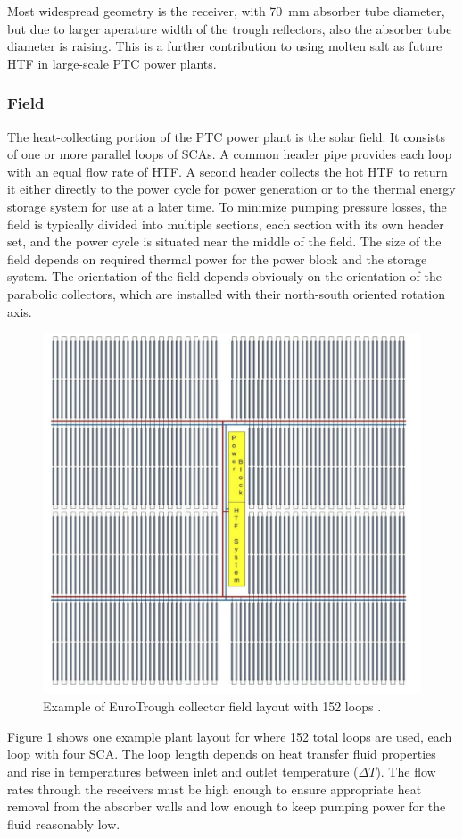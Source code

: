 Most widespread geometry is the receiver, with 70~mm absorber tube diameter, but due to larger aperature width of the trough reflectors, also the absorber tube diameter is raising. This is a further contribution to using molten salt as future HTF in large-scale PTC power plants. 
\pagebreak
\subsubsection{Field}
The heat-collecting portion of the PTC power plant is the solar field. It consists of one or more parallel loops of SCAs. A common header pipe provides each loop with an equal flow rate of HTF. A second header collects the hot HTF to return it either directly to the power cycle for power generation or to the thermal energy storage system for use at a later time. To minimize pumping pressure losses, the field is typically divided into multiple sections, each section with its own header set, and the power cycle is situated near the middle of the field. The size of the field depends on required thermal power for the power block and the storage system. The orientation of the field depends obviously on the orientation of the parabolic collectors, which are installed with their north-south oriented rotation axis.
\begin{figure}[!h] 
\centering
\includegraphics[width=0.7\linewidth]{FIG/PTC_field_EuroTrough}
\caption[Example of a EuroTrough collector field layout with 152 loops.]{Example of EuroTrough collector field layout with 152 loops \cite{VonReeken2014}.}\label{PTC_field_EuroTrough}
\end{figure}
Figure \ref{PTC_field_EuroTrough} shows one example plant layout for where  152 total loops are used, each loop with four SCA. The loop length depends on heat transfer fluid properties and rise in temperatures between inlet and outlet temperature ($\Delta T$). The flow rates through the receivers must be high enough to ensure appropriate heat removal from the absorber walls and low enough to keep pumping power for the fluid reasonably low.
\pagebreak
